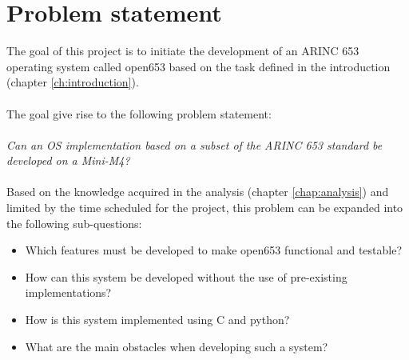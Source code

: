 \chapter{Problem statement}


The goal of this project is to initiate the development of an ARINC 653
operating system called open653 based on the task defined in the
introduction (chapter \ref{ch:introduction}).
\\\\
The goal give rise to the following problem statement:
\\\\
\textit{Can an OS implementation based on a subset of the ARINC 653 standard be
developed on a Mini-M4?}
\\\\
Based on the knowledge acquired in the analysis (chapter \ref{chap:analysis})
and limited by the time scheduled for the project, this problem can be expanded
into the following sub-questions:

\begin{itemize}
	\item Which features must be developed to make open653 functional and testable?
	\item How can this system be developed without the use of pre-existing
		implementations?
	\item How is this system implemented using C and python?
	\item What are the main obstacles when developing such a system?
\end{itemize}
